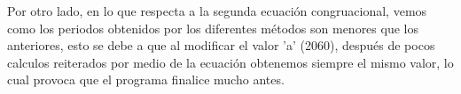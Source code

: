 \documentclass{article}
\begin{document}
	Por otro lado, en lo que respecta a la segunda ecuación congruacional, vemos como los periodos obtenidos por los diferentes métodos son menores que los anteriores, esto se debe a que al modificar el valor 'a' (2060), después de pocos calculos reiterados por medio de la ecuación obtenemos siempre el mismo valor, lo cual provoca que el programa finalice mucho antes.
	



	
\end{document}
